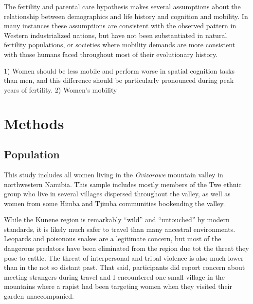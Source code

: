 	
The fertility and parental care hypothesis makes several assumptions about the relationship between demographics and life history and cognition and mobility.  In many instances these assumptions are consistent with the observed pattern in Western industrialized nations, but have not been substantiated in natural fertility populations, or societies where mobility demands are more consistent with those humans faced throughout most of their evolutionary history.

1) Women should be less mobile and perform worse in spatial cognition tasks than men, and this difference should be particularly pronounced during peak years of fertility.  2) Women's mobility 



\section{Methods}
\label{sec:2}
	\subsection{Population}
This study includes all women living in the \emph{Ovizorowe} mountain valley in northwestern Namibia.  This sample includes mostly members of the Twe ethnic group who live in several villages dispersed throughout the valley, as well as women from some Himba and Tjimba communities bookending the valley. 

While the Kunene region is remarkably ``wild'' and ``untouched'' by modern standards, it is likely much safer to travel than many ancestral environments.  Leopards and poisonous snakes are a legitimate concern, but most of the dangerous predators have been eliminated from the region due tot the threat they pose to cattle.  The threat of interpersonal and tribal violence is also much lower than in the not so distant past.  That said, participants did report concern about meeting strangers during travel and I encountered one small village in the mountains where a rapist had been targeting women when they visited their garden unaccompanied. 

